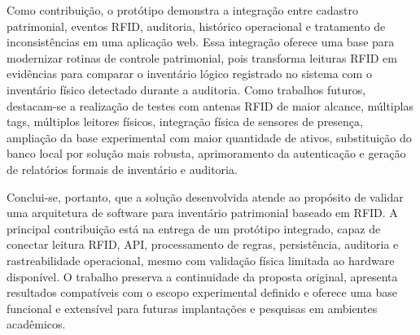 Como contribuição, o protótipo demonstra a integração entre cadastro patrimonial, eventos RFID, auditoria, histórico operacional e tratamento de inconsistências em uma aplicação web. Essa integração oferece uma base para modernizar rotinas de controle patrimonial, pois transforma leituras RFID em evidências para comparar o inventário lógico registrado no sistema com o inventário físico detectado durante a auditoria. Como trabalhos futuros, destacam-se a realização de testes com antenas RFID de maior alcance, múltiplas tags, múltiplos leitores físicos, integração física de sensores de presença, ampliação da base experimental com maior quantidade de ativos, substituição do banco local por solução mais robusta, aprimoramento da autenticação e geração de relatórios formais de inventário e auditoria.

Conclui-se, portanto, que a solução desenvolvida atende ao propósito de validar uma arquitetura de software para inventário patrimonial baseado em RFID. A principal contribuição está na entrega de um protótipo integrado, capaz de conectar leitura RFID, API, processamento de regras, persistência, auditoria e rastreabilidade operacional, mesmo com validação física limitada ao hardware disponível. O trabalho preserva a continuidade da proposta original, apresenta resultados compatíveis com o escopo experimental definido e oferece uma base funcional e extensível para futuras implantações e pesquisas em ambientes acadêmicos.
